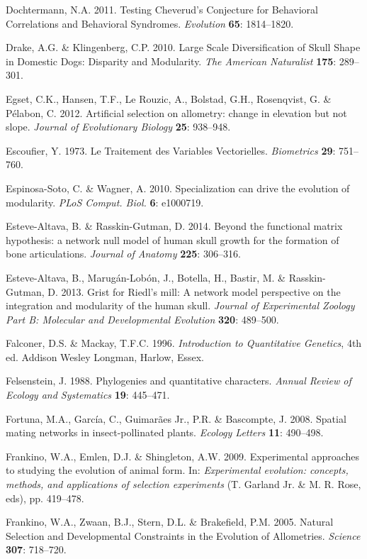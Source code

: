 \documentclass[12pt,twoside]{report}
\begin{document}
Dochtermann, N.A. 2011. Testing Cheverud's Conjecture for Behavioral
Correlations and Behavioral Syndromes. \emph{Evolution} \textbf{65}:
1814--1820.

Drake, A.G. \& Klingenberg, C.P. 2010. Large Scale Diversification of
Skull Shape in Domestic Dogs: Disparity and Modularity. \emph{The
American Naturalist} \textbf{175}: 289--301.

Egset, C.K., Hansen, T.F., Le Rouzic, A., Bolstad, G.H., Rosenqvist, G.
\& Pélabon, C. 2012. Artificial selection on allometry: change in
elevation but not slope. \emph{Journal of Evolutionary Biology}
\textbf{25}: 938--948.

Escoufier, Y. 1973. Le Traitement des Variables Vectorielles.
\emph{Biometrics} \textbf{29}: 751--760.

Espinosa-Soto, C. \& Wagner, A. 2010. Specialization can drive the
evolution of modularity. \emph{PLoS Comput. Biol.} \textbf{6}: e1000719.

Esteve-Altava, B. \& Rasskin-Gutman, D. 2014. Beyond the functional
matrix hypothesis: a network null model of human skull growth for the
formation of bone articulations. \emph{Journal of Anatomy} \textbf{225}:
306--316.

Esteve-Altava, B., Marugán-Lobón, J., Botella, H., Bastir, M. \&
Rasskin-Gutman, D. 2013. Grist for Riedl's mill: A network model
perspective on the integration and modularity of the human skull.
\emph{Journal of Experimental Zoology Part B: Molecular and
Developmental Evolution} \textbf{320}: 489--500.

Falconer, D.S. \& Mackay, T.F.C. 1996. \emph{Introduction to
Quantitative Genetics}, 4th ed. Addison Wesley Longman, Harlow, Essex.

Felsenstein, J. 1988. Phylogenies and quantitative characters.
\emph{Annual Review of Ecology and Systematics} \textbf{19}: 445--471.

Fortuna, M.A., García, C., Guimarães Jr., P.R. \& Bascompte, J. 2008.
Spatial mating networks in insect-pollinated plants. \emph{Ecology
Letters} \textbf{11}: 490--498.

Frankino, W.A., Emlen, D.J. \& Shingleton, A.W. 2009. Experimental
approaches to studying the evolution of animal form. In:
\emph{Experimental evolution: concepts, methods, and applications of
selection experiments} (T. Garland Jr. \& M. R. Rose, eds), pp.
419--478.

Frankino, W.A., Zwaan, B.J., Stern, D.L. \& Brakefield, P.M. 2005.
Natural Selection and Developmental Constraints in the Evolution of
Allometries. \emph{Science} \textbf{307}: 718--720.
\end{document}
